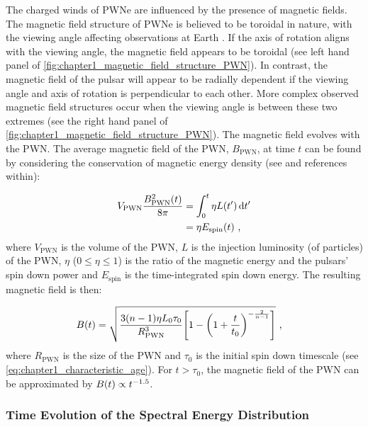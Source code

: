 The charged winds of PWNe are influenced by the presence of magnetic fields. The magnetic field structure of PWNe is believed to be toroidal in nature, with the viewing angle affecting observations at Earth \citep{2006ApJ...638..225K, 2012SSRv..166..231R}. If the axis of rotation aligns with the viewing angle, the magnetic field appears to be toroidal (see left hand panel of \autoref{fig:chapter1_magnetic_field_structure_PWN}). In contrast, the magnetic field of the pulsar will appear to be radially dependent if the viewing angle and axis of rotation is perpendicular to each other. More complex observed magnetic field structures occur when the viewing angle is between these two extremes (see the right hand panel of \autoref{fig:chapter1_magnetic_field_structure_PWN}).
\newpar
The magnetic field evolves with the PWN. The average magnetic field of the PWN, $B_\text{PWN}$, at time $t$ can be found by considering the conservation of magnetic energy density (see \cite{2010ApJ...715.1248T} and references within):

\begin{equation}
    \begin{aligned}
    V_\text{PWN}\frac{B^2_\text{PWN}\qty(t)}{8\pi}&=\int_0^t\eta L\qty(t')\dd{t'} \\
    &=\eta E_\text{spin}\qty(t)\text{ ,}
    \end{aligned} \label{eq:chapter_1_magnetic_conservation_energy}
\end{equation}
\noindent where $V_\text{PWN}$ is the volume of the PWN, $L$ is the injection luminosity (of particles) of the PWN, $\eta$ ($0\leq\eta\leq 1$) is the ratio of the magnetic energy and the pulsars' spin down power and $E_\text{spin}$ is the time-integrated spin down energy. The resulting magnetic field is then:

\begin{equation}
    \begin{aligned}
    B\qty(t)&=\sqrt{\frac{3\qty(n-1)\eta L_0\tau_0}{R^3_\text{PWN}}\qty[1-\qty(1+\frac{t}{t_0})^{-\frac{2}{n-1}}]}\text{ ,}
    \end{aligned} \label{eq:chapter_1_magnetic_field_ev}
\end{equation}
\noindent where $R_\text{PWN}$ is the size of the PWN and $\tau_0$ is the initial spin down timescale (see \autoref{eq:chapter1_characteristic_age}). For $t>\tau_0$, the magnetic field of the PWN can be approximated by $B\qty(t)\propto t^{-1.5}$.

\subsubsection{Time Evolution of the Spectral Energy Distribution}

